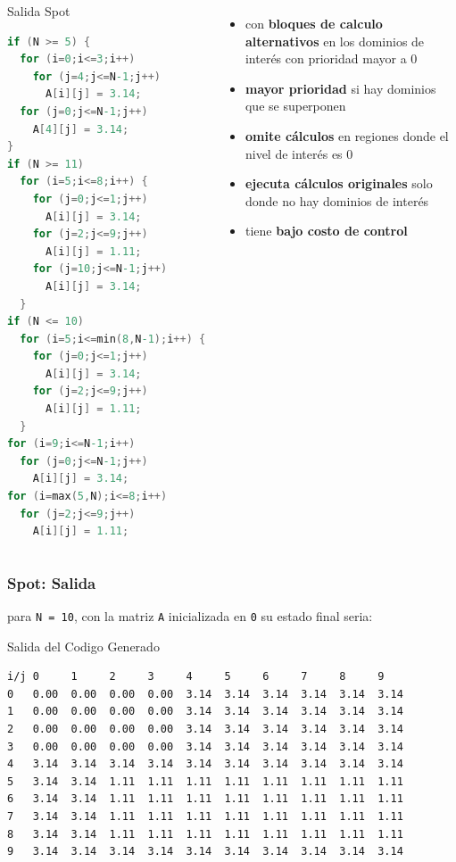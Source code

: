 \documentclass{beamer}\usetheme{Madrid} %
\begin{document}
\begin{frame}[fragile]
\begin{columns}
\begin{block}{Salida Spot}
\begin{lstlisting}[basicstyle=\tiny,language=C]
if (N >= 5) {
  for (i=0;i<=3;i++) 
    for (j=4;j<=N-1;j++) 
      A[i][j] = 3.14;
  for (j=0;j<=N-1;j++) 
    A[4][j] = 3.14;
}
if (N >= 11) 
  for (i=5;i<=8;i++) {
    for (j=0;j<=1;j++) 
      A[i][j] = 3.14;
    for (j=2;j<=9;j++) 
      A[i][j] = 1.11;
    for (j=10;j<=N-1;j++) 
      A[i][j] = 3.14;
  }
if (N <= 10) 
  for (i=5;i<=min(8,N-1);i++) {
    for (j=0;j<=1;j++) 
      A[i][j] = 3.14;
    for (j=2;j<=9;j++) 
      A[i][j] = 1.11;
  }
for (i=9;i<=N-1;i++) 
  for (j=0;j<=N-1;j++) 
    A[i][j] = 3.14;
for (i=max(5,N);i<=8;i++) 
  for (j=2;j<=9;j++) 
    A[i][j] = 1.11;
\end{lstlisting}
\end{block}
\begin{itemize}
\item con \textbf{bloques de calculo alternativos} en los dominios de interés
con prioridad mayor a 0
\item \textbf{mayor prioridad} si hay dominios que se superponen
\item \textbf{omite cálculos} en regiones donde el nivel de interés es 0
\item \textbf{ejecuta cálculos originales} solo donde no hay dominios de interés
\item tiene \textbf{bajo costo de control}
\end{itemize}
\end{columns}
\end{frame}
\begin{frame}[fragile]
\frametitle{Spot: Salida}
para \lstinline{N = 10}, con la matriz \lstinline{A} inicializada en \lstinline{0}
su estado final seria:
\begin{block}{Salida del Codigo Generado}
\begin{lstlisting}[basicstyle=\scriptsize] 
i/j 0     1     2     3     4     5     6     7     8     9
0   0.00  0.00  0.00  0.00  3.14  3.14  3.14  3.14  3.14  3.14 
1   0.00  0.00  0.00  0.00  3.14  3.14  3.14  3.14  3.14  3.14 
2   0.00  0.00  0.00  0.00  3.14  3.14  3.14  3.14  3.14  3.14 
3   0.00  0.00  0.00  0.00  3.14  3.14  3.14  3.14  3.14  3.14 
4   3.14  3.14  3.14  3.14  3.14  3.14  3.14  3.14  3.14  3.14 
5   3.14  3.14  1.11  1.11  1.11  1.11  1.11  1.11  1.11  1.11 
6   3.14  3.14  1.11  1.11  1.11  1.11  1.11  1.11  1.11  1.11 
7   3.14  3.14  1.11  1.11  1.11  1.11  1.11  1.11  1.11  1.11 
8   3.14  3.14  1.11  1.11  1.11  1.11  1.11  1.11  1.11  1.11 
9   3.14  3.14  3.14  3.14  3.14  3.14  3.14  3.14  3.14  3.14
\end{lstlisting}
\end{block}
\end{frame}
\end{document}
